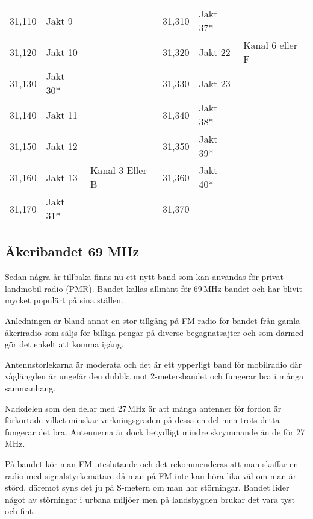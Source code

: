 \begin{longtable}{rll|rll}
	           31,110 & Jakt 9             &                   &   31,310          &   Jakt 37*         &                   \\
	           31,120 & Jakt 10            &                   &   31,320          &   Jakt 22          & Kanal 6 eller F   \\
	           31,130 & Jakt 30*           &                   &   31,330          &   Jakt 23          &                   \\
	           31,140 & Jakt 11            &                   &   31,340          &   Jakt 38*         &                   \\
	           31,150 & Jakt 12            &                   &   31,350          &   Jakt 39*        &                   \\
	           31,160 & Jakt 13            & Kanal 3 Eller B   &   31,360          &   Jakt 40*         &                   \\
	           31,170 & Jakt 31*           &                   &   31,370          &                    &\\
\end{longtable}

\subsection{Åkeribandet 69 MHz}
\label{69-MHz}

Sedan några år tillbaka finns nu ett nytt band som kan användas för privat
landmobil radio (PMR). Bandet kallas allmänt för 69\,MHz-bandet och har blivit
mycket populärt på sina ställen.

Anledningen är bland annat en stor tillgång på FM-radio för bandet från gamla
åkeriradio som säljs för billiga pengar på diverse begagnatsajter och som
därmed gör det enkelt att komma igång.

Antennstorlekarna är moderata och det är ett ypperligt band för mobilradio där
våglängden är ungefär den dubbla mot 2-metersbandet och fungerar bra i många
sammanhang.

Nackdelen som den delar med 27\,MHz är att många antenner för fordon är
förkortade vilket minskar verkningsgraden på dessa en del men trots detta
fungerar det bra. Antennerna är dock betydligt mindre skrymmande än de för
27\,MHz.

På bandet kör man FM uteslutande och det rekommenderas att man skaffar en
radio med signalstyrkemätare då man på FM inte kan höra lika väl om man är
störd, däremot syns det ju på S-metern om man har störningar. Bandet lider
något av störningar i urbana miljöer men på landsbygden brukar det vara tyst
och fint.

